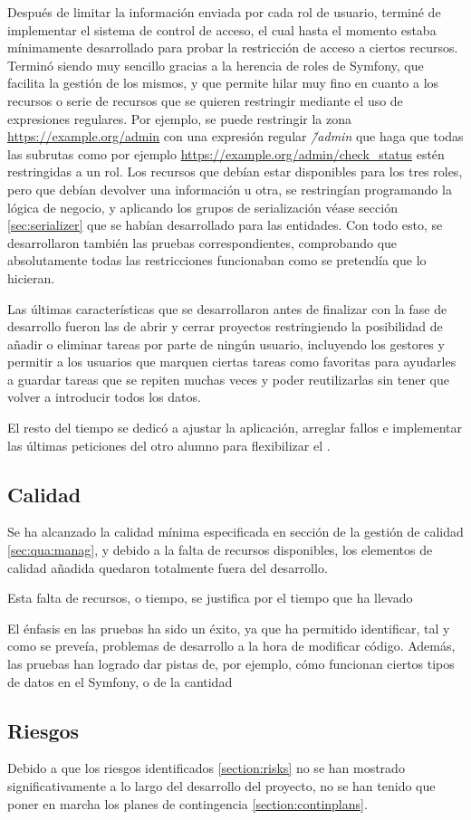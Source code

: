 Después de limitar la información enviada por cada rol de usuario, terminé de implementar el sistema
de control de acceso, el cual hasta el momento estaba mínimamente desarrollado para probar la restricción de
acceso a ciertos recursos. Terminó siendo muy sencillo gracias a la herencia de roles de Symfony,
que facilita la gestión de los mismos, y que permite hilar muy fino en cuanto a los recursos o
serie de recursos que se quieren restringir mediante el uso de expresiones regulares. Por ejemplo, 
se puede restringir la zona \url{https://example.org/admin} con una expresión regular \textit{\^/admin} que haga que todas las
subrutas como por ejemplo \url{https://example.org/admin/check_status} estén restringidas a un rol.
Los recursos que debían estar disponibles para los tres roles, pero que debían devolver una información u otra,
se restringían programando la lógica de negocio, y aplicando los grupos de serialización
\textemdash véase sección \ref{sec:serializer} \textemdash que se habían desarrollado para las
entidades. Con todo esto, se desarrollaron también las pruebas correspondientes, comprobando que
absolutamente todas las restricciones funcionaban como se pretendía que lo hicieran.

Las últimas características que se desarrollaron antes de finalizar con la fase de desarrollo
fueron las de abrir y cerrar proyectos \textemdash restringiendo la posibilidad de añadir o
eliminar tareas por parte de ningún usuario, incluyendo los gestores \textemdash y permitir a
los usuarios que marquen ciertas tareas como favoritas \textemdash para ayudarles a guardar tareas que se
repiten muchas veces y poder reutilizarlas sin tener que volver a introducir todos los datos\textemdash.

El resto del tiempo se dedicó a ajustar la aplicación, arreglar fallos e implementar las
últimas peticiones del otro alumno para flexibilizar el .


\subsection{Calidad}
Se ha alcanzado la calidad mínima especificada en sección de la gestión de
calidad \ref{sec:qua:manag}, y debido a la falta de recursos disponibles, los
elementos de calidad añadida quedaron totalmente fuera del desarrollo.

Esta falta de recursos, o tiempo, se justifica por el tiempo que ha llevado

El énfasis en las pruebas ha sido un éxito, ya que ha permitido identificar,
tal y como se preveía, problemas de desarrollo a la hora de modificar código.
Además, las pruebas han logrado dar pistas de, por ejemplo, cómo funcionan
ciertos tipos de datos en el  Symfony, o de la
cantidad

\subsection{Riesgos}
Debido a que los riesgos identificados \ref{section:risks} no se han mostrado
significativamente a lo largo del desarrollo del proyecto, no se han tenido que
poner en marcha los planes de contingencia \ref{section:continplans}.

